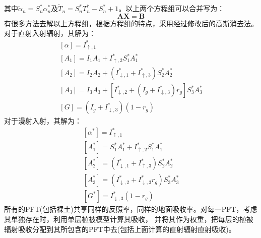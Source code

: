 其中${\widetilde{\alpha}}_n=S_n^\ast\alpha_n^\ast$及${\widetilde{T}}_n=S_n^\ast T_n^\ast-S_n^\ast+1$。以上两个方程组可以合并写为：
\begin{equation}
\mathbf{A X}=\mathbf{B}
\end{equation}
有很多方法去解以上方程组，根据方程组的特点，采用经过修改后的高斯消去法。对于直射入射辐射，其解为：
\begin{equation}
\begin{array}{l}{[\alpha]=I_{\uparrow, 1}^{*}} \\ {\left[A_{1}\right]=I_{1} A_{1}+I_{\uparrow, 2}^{*} S_{1}^{*} A_{1}^{*}} \\ {\left[A_{2}\right]=I_{2} A_{2}+\left(I_{\downarrow, 1}^{*}+I_{\uparrow, 3}^{*}\right) S_{2}^{*} A_{2}^{*}} \\ {\left[A_{3}\right]=I_{3} A_{3}+\left[I_{\downarrow, 2}^{*}+\left(I_{g}+I_{\downarrow, 3}^{*}\right) r_{g}\right] S_{3}^{*} A_{3}^{*}} \\ {[G]=\left(I_{g}+I_{\downarrow, 3}^{*}\right)\left(1-r_{g}\right)}\end{array}
\end{equation}
对于漫射入射，其解为：
\begin{equation}
\begin{array}{l}{\left[\alpha^{*}\right]=I_{\uparrow, 1}^{*}} \\ {\left[A_{1}^{*}\right]=S_{1}^{*} A_{1}^{*}+I_{\uparrow, 2}^{*} S_{1}^{*} A_{1}^{*}} \\ {\left[A_{2}^{*}\right]=\left(I_{\downarrow, 1}^{*}+I_{\uparrow, 3}^{*}\right) S_{2}^{*} A_{2}^{*}} \\ {\left[A_{3}^{*}\right]=\left(I_{\downarrow, 2}^{*}+I_{\downarrow, 3}^{*} r_{g}\right) S_{3}^{*} A_{3}^{*}} \\ {\left[G^{*}\right]=I_{\downarrow, 3}^{*}\left(1-r_{g}\right)}\end{array}
\end{equation}
所有的PFT(包括裸土)共享同样的反照率，同样的地面吸收率。对每一PFT，考虑其单独存在时，利用单层植被模型计算其吸收，
并将其作为权重，把每层的植被辐射吸收分配到其所包含的PFT中去(包括上面计算的直射辐射直射吸收)。

